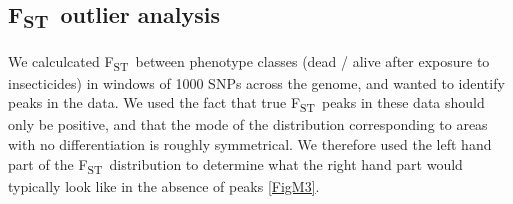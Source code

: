 \documentclass[a4paper,12pt]{article}
\newcommand{\fst}{F\textsubscript{ST}}
\begin{document}
\subsection{\fst\ outlier analysis}

We calculcated \fst\ between phenotype classes (dead / alive after exposure to insecticides) in windows of 1000 SNPs across the genome, and wanted to identify peaks in the data. We used the fact that true \fst\ peaks in these data should only be positive, and that the mode of the distribution corresponding to areas with no differentiation is roughly symmetrical. We therefore used the left hand part of the \fst\ distribution to determine what the right hand part would typically look like in the absence of peaks \ref{FigM3}. 



\printbibliography
\end{document}
